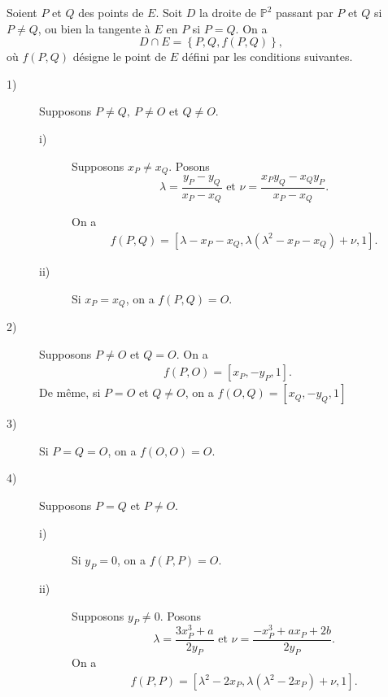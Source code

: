 \begin{proposition}
    \label{prop:proposition1}
    
    Soient $P$ et $Q$ des points de $E$. Soit $D$ la droite de $\mathbb{P}^2$ passant par $P$ et $Q$ si $P \neq Q$, ou bien la tangente à $E$ en $P$ si $P = Q$. On a
    \[
    D \cap E = \left\{ P, Q, f(P,Q) \right\}
    ,\] 
    où $f(P,Q)$ désigne le point de $E$ défini par les conditions suivantes.
    \begin{description}
        \item[1)] Supposons $P \neq Q, \ P \neq O$ et $Q \neq O$.
            \begin{description}
                \item[i)] Supposons $x_{P} \neq x_{Q}$. Posons
                    \[
                    \lambda = \frac{y_{P} - y_{Q}}{x_{P} - x_{Q}} \text{ et } \nu = \frac{x_{P}y_{Q} - x_{Q}y_{P}}{x_{P} - x_{Q}}
                    .\] 

On a 
\begin{align}
    \label{eq:interne1}
f(P,Q) = \left[ \lambda - x_{P} - x_{Q}, \lambda \left( \lambda^2 - x_{P} - x_{Q} \right) + \nu, 1 \right]
.\end{align}
                \item[ii)] Si $x_{P} = x_{Q}$, on a $f(P,Q) = O$.
            \end{description}
        \item[2)] Supposons $P \neq O$ et $Q = O$. On a
            \begin{align}
                \label{eq:interne2}
            f(P,O) = \left[ x_{P}, -y_{P}, 1 \right]
            .\end{align}
            De même, si $P = O$ et $Q \neq O$, on a $f(O,Q) = \left[ x_{Q}, -y_{Q}, 1 \right]$
        \item[3)] Si $P = Q = O$, on a $f(O,O) = O$.
        \item[4)]  Supposons $P = Q$ et $P \neq O$.
            \begin{description}
                \item[i)] Si $y_{P} = 0$, on a $f(P,P) = O$.
                \item[ii)] Supposons $y_{P} \neq 0$. Posons
                    \[
                    \lambda = \frac{3x_{P}^3 + a}{2y_{P}} \text{ et } \nu = \frac{-x_{P}^3 + ax_{P} + 2b}{2y_{P}}
                    .\] 
On a
\begin{align}
    \label{eq:interne3}
f(P,P) = \left[ \lambda^2 - 2 x_{P}, \lambda\left( \lambda^2 - 2x_{P} \right) + \nu, 1 \right]
.\end{align}
            \end{description}
    \end{description}
\end{proposition}

